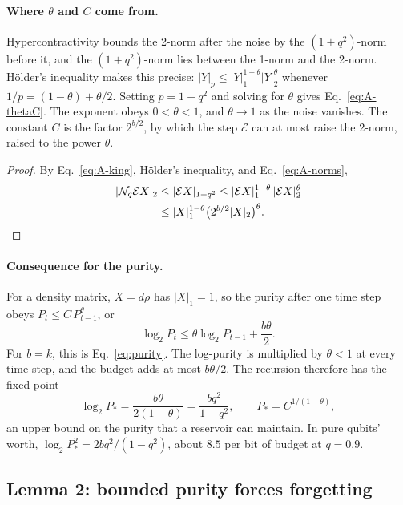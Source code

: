 \documentclass[aps,pra,reprint,superscriptaddress,floatfix]{revtex4-2}
\theoremstyle{plain}
\newcommand{\nrm}[2]{\lvert #1\rvert_{#2}}
\newcommand{\cE}{\mathcal E}
\newcommand{\Nq}{\mathcal N_q}
\begin{document}
\paragraph*{Where $\theta$ and $C$ come from.}
Hypercontractivity bounds the 2-norm after the noise by the $(1+q^2)$-norm before it, and the $(1+q^2)$-norm lies between the 1-norm and the 2-norm. H\"older's inequality makes this precise: $\nrm Yp\le\nrm Y1^{1-\theta}\nrm Y2^{\theta}$ whenever $1/p=(1-\theta)+\theta/2$. Setting $p=1+q^2$ and solving for $\theta$ gives Eq.~\eqref{eq:A-thetaC}. The exponent obeys $0<\theta<1$, and $\theta\to1$ as the noise vanishes. The constant $C$ is the factor $2^{b/2}$, by which the step $\cE$ can at most raise the 2-norm, raised to the power $\theta$.

\begin{proof}
By Eq.~\eqref{eq:A-king}, H\"older's inequality, and Eq.~\eqref{eq:A-norms},
\begin{align}
\nrm{\Nq\cE X}2&\le\nrm{\cE X}{1+q^2}\le\nrm{\cE X}1^{1-\theta}\,\nrm{\cE X}2^{\theta}\nonumber\\
&\le\nrm X1^{1-\theta}\bigl(2^{b/2}\nrm X2\bigr)^{\theta}. \qedhere
\end{align}
\end{proof}

\paragraph*{Consequence for the purity.}
For a density matrix, $X=d\rho$ has $\nrm X1=1$, so the purity after one time step obeys $P_t\le C\,P_{t-1}^\theta$, or
\begin{equation}
\log_2P_t\le\theta\log_2P_{t-1}+\frac{b\theta}2 .
\label{eq:A-purityrec}
\end{equation}
For $b=k$, this is Eq.~\eqref{eq:purity}. The log-purity is multiplied by $\theta<1$ at every time step, and the budget adds at most $b\theta/2$. The recursion therefore has the fixed point
\begin{equation}
\log_2P_*=\frac{b\theta}{2(1-\theta)}=\frac{bq^2}{1-q^2},\qquad P_*=C^{1/(1-\theta)},
\label{eq:A-Pstar}
\end{equation}
an upper bound on the purity that a reservoir can maintain. In pure qubits' worth, $\log_2P_*^2=2bq^2/(1-q^2)$, about $8.5$ per bit of budget at $q=0.9$.

\subsection{Lemma 2: bounded purity forces forgetting}
\label{app:forget}
\end{document}
